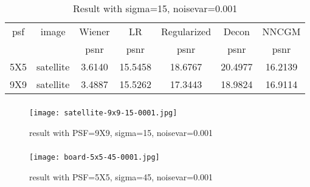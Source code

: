 \documentclass[notheorems,mathserif,table,compress,dvipsnames]{beamer}  %
\begin{document}
%
\begin{frame}
\frametitle{}
\begin{table}
\begin{tabular}{|c|c|c|c|c|c|c|} 
\hline
psf&image& \multicolumn{1}{|c|}{Wiener}&LR&Regularized&Decon&NNCGM\\
\cline{3-7}
&& psnr&psnr&psnr&psnr&psnr\\
\hline
5X5&satellite&3.6140&15.5458&18.6767&20.4977&16.2139\\
\hline
9X9&satellite&3.4887&15.5262&17.3443&18.9824&16.9114\\
\hline
\end{tabular}
\caption{Result with sigma=15, noisevar=0.001}
\end{table}
\end{frame}


%
\begin{frame}
\frametitle{ }
\begin{figure}[!ht]
\texttt{[image: satellite-9x9-15-0001.jpg]}
\caption{result with PSF=9X9, sigma=15, noisevar=0.001}
\end{figure}
\end{frame}

%
\begin{frame}
\frametitle{ }
\begin{figure}[!ht]
\texttt{[image: board-5x5-45-0001.jpg]}
\caption{result with PSF=5X5, sigma=45, noisevar=0.001}
\end{figure}
\end{frame}
\end{document}
